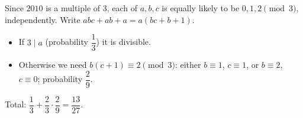 Since $2010$ is a multiple of $3$, each of $a,b,c$ is equally likely to be $0,1,2\pmod3$, independently. Write $abc+ab+a=a(bc+b+1)$.
\begin{itemize}
\item If $3\mid a$ (probability $\dfrac{1}{3}$) it is divisible.
\item Otherwise we need $b(c+1)\equiv2\pmod3$: either $b\equiv1$, $c\equiv1$, or $b\equiv2$, $c\equiv0$; probability $\dfrac{2}{9}$.
\end{itemize}
Total: $\dfrac{1}{3}+\dfrac{2}{3}\cdot\dfrac{2}{9}=\boxed{\dfrac{13}{27}}$.
